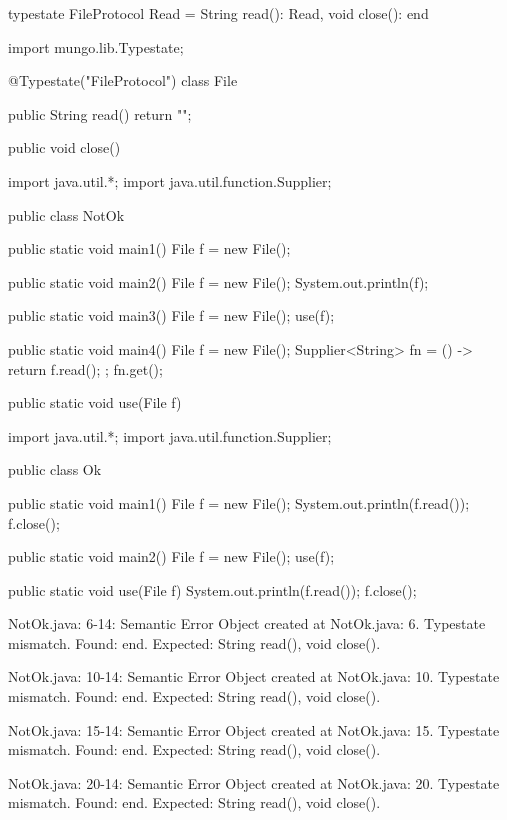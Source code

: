 \begin{code}
typestate FileProtocol {
  Read = {
    String read(): Read,
    void close(): end
  }
}\end{code}

\begin{code}
import mungo.lib.Typestate;

@Typestate("FileProtocol")
class File {

  public String read() {
    return "";
  }

  public void close() {
  }

}\end{code}

\begin{code}
import java.util.*;
import java.util.function.Supplier;

public class NotOk {
  public static void main1() {
    File f = new File();
  }

  public static void main2() {
    File f = new File();
    System.out.println(f);
  }

  public static void main3() {
    File f = new File();
    use(f);
  }

  public static void main4() {
    File f = new File();
    Supplier<String> fn = () -> {
      return f.read();
    };
    fn.get();
  }

  public static void use(File f) {

  }
}\end{code}

\begin{code}
import java.util.*;
import java.util.function.Supplier;

public class Ok {
  public static void main1() {
    File f = new File();
    System.out.println(f.read());
    f.close();
  }

  public static void main2() {
    File f = new File();
    use(f);
  }

  public static void use(File f) {
    System.out.println(f.read());
    f.close();
  }
}\end{code}

\lstset{caption=Original Mungo output}
\begin{code}

NotOk.java: 6-14: Semantic Error
		Object created at NotOk.java: 6. Typestate mismatch. Found: end. Expected: String read(), void close().

NotOk.java: 10-14: Semantic Error
		Object created at NotOk.java: 10. Typestate mismatch. Found: end. Expected: String read(), void close().

NotOk.java: 15-14: Semantic Error
		Object created at NotOk.java: 15. Typestate mismatch. Found: end. Expected: String read(), void close().

NotOk.java: 20-14: Semantic Error
		Object created at NotOk.java: 20. Typestate mismatch. Found: end. Expected: String read(), void close().
\end{code}

